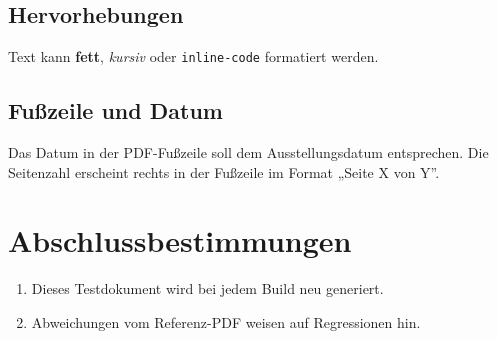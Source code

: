 \documentclass[
  ngerman,
]{article}
\providecommand{\tightlist}{%
  \setlength{\itemsep}{0pt}\setlength{\parskip}{0pt}}
\begin{document}
\subsection{Hervorhebungen}\label{hervorhebungen}

Text kann \textbf{fett}, \emph{kursiv} oder \texttt{inline-code}
formatiert werden.

\subsection{Fußzeile und Datum}\label{fuuxdfzeile-und-datum}

Das Datum in der PDF-Fußzeile soll dem Ausstellungsdatum entsprechen.
Die Seitenzahl erscheint rechts in der Fußzeile im Format „Seite X von
Y''.

\section{Abschlussbestimmungen}\label{abschlussbestimmungen}

\begin{enumerate}
\def\labelenumi{\arabic{enumi}.}
\tightlist
\item
  Dieses Testdokument wird bei jedem Build neu generiert.
\item
  Abweichungen vom Referenz-PDF weisen auf Regressionen hin.
\end{enumerate}
\end{document}
